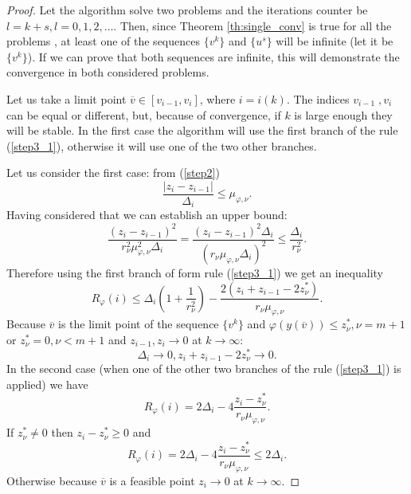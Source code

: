 \documentclass[runningheads]{llncs}
\begin{document}
\begin{proof}
  Let the algorithm solve two problems and the iterations counter be \(l = k + s, l=0,1,2,\dots\).
  Then, since Theorem \ref{th:single_conv} is true for all the problems , at least one of the sequences
  \(\{v^k\}\) and \(\{u^s\}\) will be infinite (let it be \(\{v^k\}\)). If we can prove that both   sequences are infinite, this will demonstrate the convergence in both considered problems.

  Let us take a limit point \(\overline{v}\in [v_{i-1},v_i]\), where \(i=i(k)\). The indices \(v_{i-1}\;,v_i\)
  can be equal or different, but, because of convergence, if \(k\) is large enough they will be stable.
  In the first case the algorithm will use the first branch of the rule (\ref{step3_1}), otherwise it will use
  one of the two other branches.

  Let us consider the first case: from (\ref{step2})
  \begin{displaymath}
    \frac{|z_i-z_{i-1}|}{\Delta_i} \leqslant \mu_{\varphi,\nu}.
  \end{displaymath}
  Having considered that we can establish an upper bound:
  \begin{displaymath}
    \frac{(z_i-z_{i-1})^2}{r_\nu^2\mu_{\varphi,\nu}^2\Delta_i}=\frac{(z_i-z_{i-1})^2\Delta_i}{(r_\nu\mu_{\varphi,\nu}\Delta_i)^2}
    \leqslant \frac{\Delta_i}{r_\nu^2}.
  \end{displaymath}
  Therefore using the first branch of form rule (\ref{step3_1}) we get an inequality
  \begin{equation}
    \label{eq:th1}
    R_\varphi(i)\leqslant\Delta_i(1 + \frac{1}{r_\nu^2}) - \frac{2(z_i+z_{i-1}-2z^*_\nu)}{r_\nu\mu_{\varphi,\nu}}.
  \end{equation}
  Because \(\overline{v}\) is the limit point of the sequence \(\{v^k\}\) and \(\varphi(y(\overline{v}))\leqslant z^*_{\nu}, \nu=m+1\) or
  \(z^*_\nu=0, \nu<m+1\) and \(z_{i-1},z_i\to 0\) at \(k\to\infty\):
  \begin{equation}
    \label{eq:th2}
    \Delta_i\to 0, z_i+z_{i-1} - 2 z_\nu^*\to 0.
  \end{equation}
  In the second case (when one of the other two branches of the rule (\ref{step3_1}) is applied) we have
  \begin{displaymath}
    R_\varphi(i)=2\Delta_i - 4\frac{z_i-z^*_\nu}{r_\nu\mu_{\varphi,\nu}}.
  \end{displaymath}
  If \(z^*_\nu \ne 0\) then \(z_i-z^*_\nu \geqslant 0\) and
  \begin{equation}
    \label{eq:th3}
    R_\varphi(i)=2\Delta_i - 4\frac{z_i-z^*_\nu}{r_\nu\mu_{\varphi,\nu}} \leqslant 2\Delta_i.
  \end{equation}
  Otherwise because  \(\overline{v}\) is a feasible point \(z_i\to 0\) at \(k\to\infty\).


\end{proof}
\end{document}
